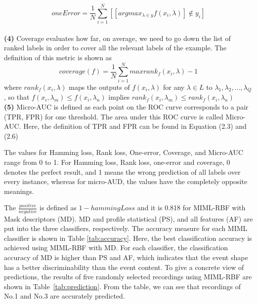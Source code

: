 \begin{equation}
oneError = \frac{1}{N}\sum_{i=1}^{N}[[argmax_{\lambda \in y} f(x_{i},\lambda)] \not \in y_{i} ]
\end{equation}
\\
\textbf{(4)} 
Coverage evaluates how far, on average, we need to go down
the list of ranked labels in order to cover all the relevant labels of the example. The definition of this metric is shown as
\begin{equation}
coverage(f)= \frac{1}{N}\sum_{i=1}^{N} max {rank_{f}(x_{i}, \lambda)-1}
\end{equation}
where $rank_{f}(x_{i}, \lambda)$ maps the outputs of $f(x_{i}, \lambda)$ for any
$\lambda \in L$ to ${\lambda_{1},\lambda_{2},...,\lambda_{Q}}$, so that 
$f(x_{i}, \lambda_{m}) \leq f(x_{i}, \lambda_{n})$ implies 
$rank_{f}(x_{i}, \lambda_{m}) \leq rank_{f}(x_{i}, \lambda_{n})$ 
\\
\textbf{(5)} 
Micro-AUC is defined as each point on the ROC curve corresponds to a pair (TPR, FPR) for one threshold. The area under this ROC curve is called Micro-AUC. Here, the definition of TPR and FPR can be found in Equation (2.3) and (2.6)


The values for Hamming loss, Rank loss, One-error, Coverage, and Micro-AUC range from 0 to 1. For Hamming loss, Rank loss, one-error and coverage, 0 denotes the perfect result, and 1 means the wrong prediction of all labels over every instance, whereas for micro-AUD, the values
have the completely opposite meanings. 

The $\frac{positive}{negative}$ is defined as $1-hammingLoss$ and it is 0.818 for MIML-RBF with Mask descriptors (MD). MD and profile statistical (PS), and all features (AF) are put into the three classifiers, respectively. The accuracy measure for each MIML classifier is shown in Table \ref{tab:accuracy}. Here, the best classification accuracy is achieved using MIML-RBF with MD. For each classifier, the classification accuracy of MD is higher than PS and AF, which indicates that the event shape has a better discriminability than the event content. To give a concrete view of predictions, the results of five randomly selected recordings using MIML-RBF are shown in Table~\ref{tab:prediction}. From the table, we can see that recordings of No.1 and No.3 are accurately predicted. 




